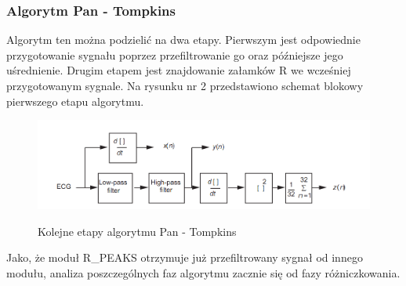 \subsubsection{Algorytm Pan - Tompkins}

Algorytm ten można podzielić na dwa etapy. Pierwszym jest odpowiednie przygotowanie sygnału poprzez przefiltrowanie go oraz późniejsze jego uśrednienie. Drugim etapem jest znajdowanie załamków R we wcześniej przygotowanym sygnale. Na rysunku nr 2 przedstawiono schemat blokowy pierwszego etapu algorytmu.
\begin{figure}[H]
\centering
\includegraphics[scale=0.4]{R_PEAKS/img/pan_tompkins_alg}
\label{fig:RPPTA}
\caption{Kolejne etapy algorytmu Pan - Tompkins}
\end{figure}
Jako, że moduł R\_PEAKS otrzymuje już przefiltrowany sygnał od innego modułu, analiza poszczególnych faz algorytmu zacznie się od fazy różniczkowania.
